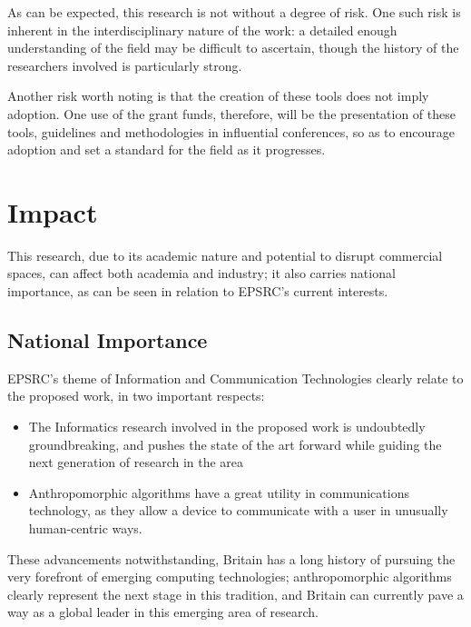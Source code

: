 
As can be expected, this research is not without a degree of risk. One such risk is inherent in the interdisciplinary nature of the work: a detailed enough understanding of the field may be difficult to ascertain, though the history of the researchers involved is particularly strong.\par

Another risk worth noting is that the creation of these tools does not imply adoption. One use of the grant funds, therefore, will be the presentation of these tools, guidelines and methodologies in influential conferences, so as to encourage adoption and set a standard for the field as it progresses.\par

\section{Impact}
\label{sec:proposed_approach}
This research, due to its academic nature and potential to disrupt commercial spaces, can affect both academia and industry; it also carries national importance, as can be seen in relation to EPSRC's current interests.

\subsection{National Importance}
\label{sec:national_importance}
EPSRC's theme of Information and Communication Technologies clearly relate to the proposed work, in two important respects:
\begin{itemize}
    \item The Informatics research involved in the proposed work is undoubtedly groundbreaking, and pushes the state of the art forward while guiding the next generation of research in the area
    \item Anthropomorphic algorithms have a great utility in communications technology, as they allow a device to communicate with a user in unusually human-centric ways.\cite{Crawford2013127}
\end{itemize}

These advancements notwithstanding, Britain has a long history of pursuing the very forefront of emerging computing technologies; anthropomorphic algorithms clearly represent the next stage in this tradition, and Britain can currently pave a way as a global leader in this emerging area of research.

